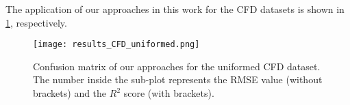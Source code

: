 \documentclass[11pt, authoryear]{elsarticle}
\renewcommand\textcolor[2]{#2}
\begin{document}
\begin{appendix}
		\textcolor{red}{
			The application of our approaches in this work for the CFD datasets is shown in \cref{fig:results_CFD_uniformed}, respectively.
		}
		\begin{figure}
			\centering
			\texttt{[image: results\_CFD\_uniformed.png]}
			\caption[]{Confusion matrix of our approaches for the uniformed CFD dataset. The number inside the sub-plot represents the RMSE value (without brackets) and the $R^2$ score (with brackets).}	
			\label{fig:results_CFD_uniformed}
		\end{figure}
		
	\end{appendix}
	
	
\end{document}
